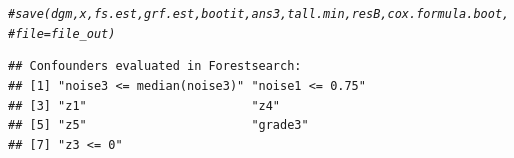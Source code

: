 \documentclass[smallextended]{svjour3}
\makeatletter
\newcommand{\hlcom}[1]{\textcolor[rgb]{0.678,0.584,0.686}{\textit{#1}}}%
\newenvironment{kframe}{%
 \def\at@end@of@kframe{}%
 \ifinner\ifhmode%
  \def\at@end@of@kframe{\end{minipage}}%
  \begin{minipage}{\columnwidth}%
 \fi\fi%
 \def\FrameCommand##1{\hskip\@totalleftmargin \hskip-\fboxsep
 \colorbox{shadecolor}{##1}\hskip-\fboxsep
     \hskip-\linewidth \hskip-\@totalleftmargin \hskip\columnwidth}%
 \MakeFramed {\advance\hsize-\width
   \@totalleftmargin\z@ \linewidth\hsize
   \@setminipage}}%
 {\par\unskip\endMakeFramed%
 \at@end@of@kframe}
\newenvironment{knitrout}{}{} %
\makeatother
\begin{document}
\begin{knitrout}
\begin{kframe}
\begin{alltt}
\hlcom{# save(dgm, x, fs.est, grf.est, bootit, ans3, tall.min, resB, cox.formula.boot,}
\hlcom{# file=file_out)}
\end{alltt}
\end{kframe}
\end{knitrout}



\begin{knitrout}
\color{fgcolor}\begin{kframe}
\begin{verbatim}
## Confounders evaluated in Forestsearch:
## [1] "noise3 <= median(noise3)" "noise1 <= 0.75"          
## [3] "z1"                       "z4"                      
## [5] "z5"                       "grade3"                  
## [7] "z3 <= 0"
\end{verbatim}
\end{kframe}
\end{knitrout}
\end{document}
